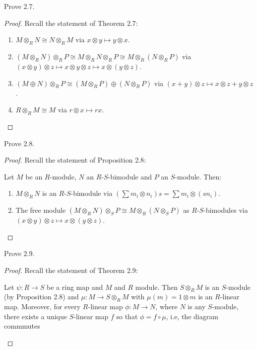 \newpage
\begin{problem}
Prove 2.7.
\end{problem}
\begin{proof}
Recall the statement of Theorem 2.7:
\begin{theorem*}
\begin{enumerate}[noitemsep,label=(\alph*)]
\item $M\otimes_R N\cong N\otimes_R M$ via $x\otimes y\mapsto
  y\otimes x$.
\item $(M\otimes_R N)\otimes_R P\cong M\otimes_R N\otimes_R
  P\cong M\otimes_R(N\otimes_R P)$ via $(x\otimes y)\otimes
  z\mapsto x\otimes y\otimes z\mapsto x\otimes (y\otimes z)$.
\item $(M\oplus N)\otimes_R P\cong (M\otimes_R P)\oplus
  (N\otimes_R P)$ via $(x+y)\otimes z\mapsto x\otimes z+y\otimes
  z$.
\item $R\otimes_R M\cong M$ via $r\otimes x\mapsto rx$.
\end{enumerate}
\end{theorem*}
\end{proof}
\newpage
\begin{problem}
Prove 2.8.
\end{problem}
\begin{proof}
Recall the statement of Proposition 2.8:
\begin{proposition*}
Let $M$ be an $R$-module, $N$ an $R$-$S$-bimodule and $P$ an
$S$-module. Then:
\begin{enumerate}[noitemsep,label=(\alph*)]
\item $M\otimes_R N$ is an $R$-$S$-bimodule via $\left(\sum
    m_i\otimes n_i\right)s=\sum m_i\otimes (sn_i).$
\item The free module $(M\otimes_R N)\otimes_S P\cong M\otimes_R
  (N\otimes_S P)$ as $R$-$S$-bimodules via $(x\otimes y)\otimes
  z\mapsto x\otimes (y\otimes z)$.
\end{enumerate}
\end{proposition*}
\end{proof}
\newpage
\begin{problem}
Prove 2.9.
\end{problem}
\begin{proof}
Recall the statement of Theorem 2.9:
\begin{theorem*}
Let $\psi\colon R\to S$ be a ring map and $M$ and $R$
module. Then $S\otimes_R M$ is an $S$-module (by Proposition
2.8) and $\mu\colon M\to S\otimes_R M$ with $\mu(m)=1\otimes m$
is an $R$-linear map. Moreover, for every $R$-linear map
$\phi\colon M\to N$, where $N$ is any $S$-module, there exists a
unique $S$-linear map $f$ so that $\phi=f\circ\mu$, i.e, the
diagram commmutes
\end{theorem*}
\end{proof}
